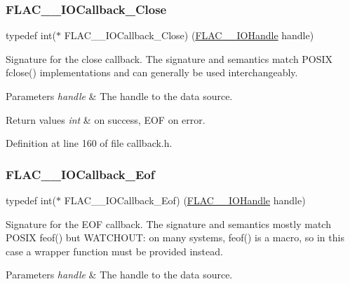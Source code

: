 \subsubsection{\texorpdfstring{FLAC\_\_IOCallback\_Close}{FLAC\_\_IOCallback\_Close}}
{\footnotesize\ttfamily typedef int($\ast$ F\+L\+A\+C\+\_\+\+\_\+\+I\+O\+Callback\+\_\+\+Close) (\mbox{\hyperlink{group__flac__callbacks_ga4c329c3168dee6e352384c5e9306260d}{F\+L\+A\+C\+\_\+\+\_\+\+I\+O\+Handle}} handle)}

Signature for the close callback. The signature and semantics match P\+O\+S\+IX fclose() implementations and can generally be used interchangeably.


\begin{DoxyParams}{Parameters}
{\em handle} & The handle to the data source. \\
\hline
\end{DoxyParams}

\begin{DoxyRetVals}{Return values}
{\em int} & {} on success, {\ttfamily E\+OF} on error. \\
\hline
\end{DoxyRetVals}


Definition at line 160 of file callback.\+h.

\mbox{\label{group__flac__callbacks_ga00ae3b3d373e691908e9539ebf720675}} 
\subsubsection{\texorpdfstring{FLAC\_\_IOCallback\_Eof}{FLAC\_\_IOCallback\_Eof}}
{\footnotesize\ttfamily typedef int($\ast$ F\+L\+A\+C\+\_\+\+\_\+\+I\+O\+Callback\+\_\+\+Eof) (\mbox{\hyperlink{group__flac__callbacks_ga4c329c3168dee6e352384c5e9306260d}{F\+L\+A\+C\+\_\+\+\_\+\+I\+O\+Handle}} handle)}

Signature for the E\+OF callback. The signature and semantics mostly match P\+O\+S\+IX feof() but W\+A\+T\+C\+H\+O\+UT\+: on many systems, feof() is a macro, so in this case a wrapper function must be provided instead.


\begin{DoxyParams}{Parameters}
{\em handle} & The handle to the data source. \\
\hline
\end{DoxyParams}

